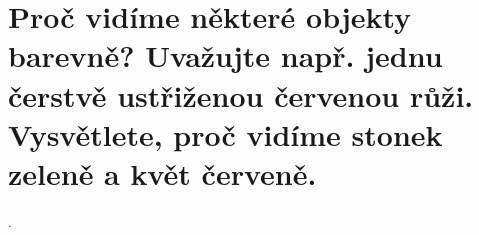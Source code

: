 \section{Proč vidíme některé objekty barevně? Uvažujte např. jednu čerstvě ustřiženou červenou růži. Vysvětlete, proč 
vidíme stonek zeleně a květ červeně.}.